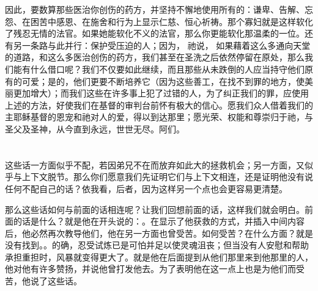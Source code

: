因此，要数算那些医治你创伤的药方，并坚持不懈地使用所有的：谦卑、告解、忘怨、在困苦中感恩、在施舍和行为上显示仁慈、恒心祈祷。那个寡妇就是这样软化了残忍无情的法官。如果她能软化不义的法官，那么你更能软化那温柔的一位。还有另一条路与此并行：保护受压迫的人；因为， 祂说，  如果藉着这么多通向天堂的道路，和这么多医治创伤的药方，我们甚至在圣洗之后依然停留在原处，那么我们能有什么借口呢？我们不仅要如此继续，而且那些从未跌倒的人应当持守他们原有的可爱；是的，他们更要不断培养它（因为这些善工，在找不到罪的地方，使美丽更加增大）；而我们这些在许多事上犯了过错的人，为了纠正我们的罪，应使用上述的方法，好使我们在基督的审判台前怀有极大的信心。愿我们众人借着我们的主耶稣基督的恩宠和祂对人的爱，得以到达那里；愿光荣、权能和尊崇归于祂，与圣父及圣神，从今直到永远，世世无尽。阿们。\par



\section{}


\subsection{}

\par

这些话一方面似乎不配，若因弟兄不在而放弃如此大的拯救机会；另一方面，又似乎与上下文脱节。那么你们愿意我们先证明它们与上下文相连，还是证明他没有说任何不配自己的话？依我看，后者，因为这样另一个点也会更容易更清楚。\par

那么这些话如何与前面的话相连呢？让我们回想前面的话，这样我们就会明白。前面的话是什么？就是他在开头说的：。在显示了他获救的方式，并插入中间内容后，他必然再次教导他们，他在另一方面也曾受苦。如何受苦？在什么方面？就是没有找到。。的确，忍受试炼已是可怕并足以使灵魂沮丧；但当没有人安慰和帮助承担重担时，风暴就变得更大了。就是他在后面提到从他们那里来到他那里的人，他对他有许多赞扬，并说他曾打发他去。为了表明他在这一点上也是为他们而受苦，他说了这些话。\par

